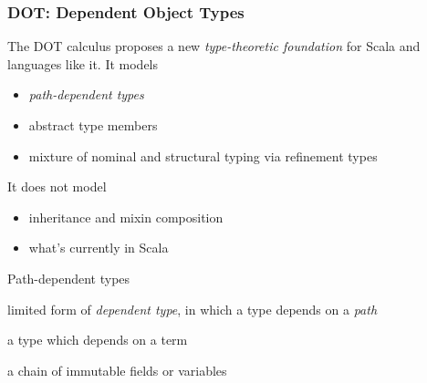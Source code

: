 \documentclass{beamer}
\begin{document}
\begin{frame}
\frametitle{DOT: Dependent Object Types}

The DOT calculus proposes a new \emph{type-theoretic foundation} for Scala
and languages like it. It models
\begin{itemize}
\item \emph{path-dependent types}
\item abstract type members
\item mixture of nominal and structural typing via refinement types
\end{itemize}

It does not model
\begin{itemize}
\item inheritance and mixin composition
\item what's currently in Scala
\end{itemize}

\end{frame}

\begin{frame}[fragile]{Path-dependent types}

\begin{description}
\item[path-dependent type] limited form of \emph{dependent type}, in which a type depends on a \emph{path}
\item[dependent type] a type which depends on a term
\item[path] a chain of immutable fields or variables
\end{description}

\inputminted[frame=lines,fontsize=\footnotesize]{scala}{intro.scala}
\end{frame}
\end{document}
